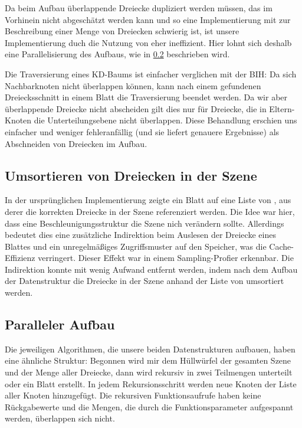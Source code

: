 Da beim Aufbau überlappende Dreiecke dupliziert werden müssen, das im Vorhinein nicht abgeschätzt werden kann und so eine Implementierung mit  zur Beschreibung einer Menge von Dreiecken schwierig ist, ist unsere Implementierung duch die Nutzung von  eher ineffizient. Hier lohnt sich deshalb eine Parallelisierung des Aufbaus, wie in \ref{ssec:parallel-accel-build} beschrieben wird.

Die Traversierung eines KD-Baums ist einfacher verglichen mit der BIH: Da sich Nachbarknoten nicht überlappen können, kann nach einem gefundenen Dreiecksschnitt in einem Blatt die Traversierung beendet werden. Da wir aber überlappende Dreiecke nicht abscheiden gilt dies nur für Dreiecke, die in Eltern-Knoten die Unterteilungsebene nicht überlappen. Diese Behandlung erschien uns einfacher und weniger fehleranfällig (und sie liefert genauere Ergebnisse) als Abschneiden von Dreiecken im Aufbau.

\subsection{Umsortieren von Dreiecken in der Szene}

In der ursprünglichen Implementierung zeigte ein Blatt auf eine Liste von , aus derer die korrekten Dreiecke in der Szene referenziert werden. Die Idee war hier, dass eine Beschleunigungsstruktur die Szene nich verändern sollte. Allerdings bedeutet dies eine zusätzliche Indirektion beim Auslesen der Dreiecke eines Blattes und ein unregelmäßiges Zugriffsmuster auf den Speicher, was die Cache-Effizienz verringert. Dieser Effekt war in einem Sampling-Profier erkennbar. Die Indirektion konnte mit wenig Aufwand entfernt werden, indem nach dem Aufbau der Datenstruktur die Dreiecke in der Szene anhand der Liste von  umsortiert werden.

\subsection{Paralleler Aufbau}
\label{ssec:parallel-accel-build}

Die jeweiligen Algorithmen, die unsere beiden Datenstrukturen aufbauen, haben eine ähnliche Struktur: Begonnen wird mir dem Hüllwürfel der gesamten Szene und der Menge aller Dreiecke, dann wird rekursiv in zwei Teilmengen unterteilt oder ein Blatt erstellt. In jedem Rekursionsschritt werden neue Knoten der Liste aller Knoten hinzugefügt. Die rekursiven Funktionsaufrufe haben keine Rückgabewerte und die Mengen, die durch die Funktionsparameter aufgespannt werden, überlappen sich nicht.

